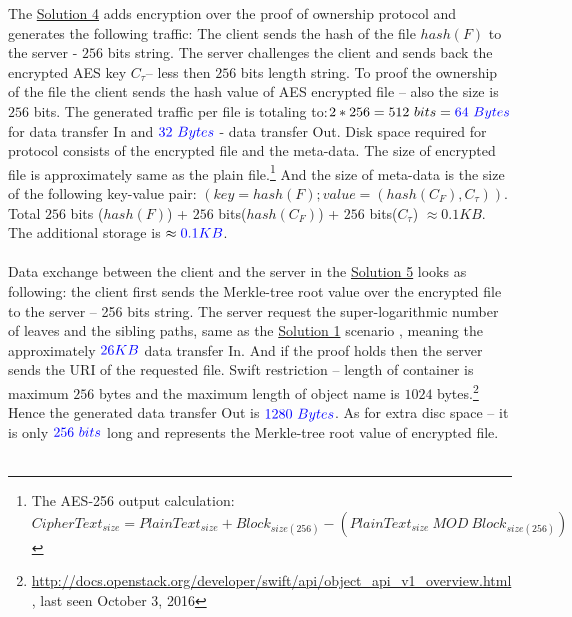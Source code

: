 \documentclass[12pt]{article}
\begin{document}
The \hyperref[sub:Soltuion4]{Solution 4} adds encryption over the proof of ownership protocol and generates the following traffic: The client sends the hash of the file $hash(F)$ to the server - $256$ bits string. The server challenges the client and sends back the encrypted AES key $C_\tau$-- less then $256$  bits length string. To proof the ownership of the file the client  sends the hash value of AES encrypted file -- also the size is $256$  bits. The generated traffic per file is totaling to:$2*256=512\ bits=\color{blue}64\ Bytes$ for data transfer In and $\color{blue}32\ Bytes$ - data transfer Out. Disk space required for protocol consists of the encrypted file and the meta-data. The size of encrypted file is approximately same as the plain file.\footnote{The AES-256 output calculation: $CipherText_{size} = PlainText_{size} + Block_{size(256)} - (PlainText_{size}\ MOD\ Block_{size(256)})$}  And the size of meta-data is the size of the following key-value pair: $(key = hash(F); value = (hash(C_F), C_\tau))$. Total  $256$ bits ($hash(F)$) + $256$ bits($hash(C_F)$) + $256$ bits($C_\tau$) $\approx0.1KB$. The additional storage is $\approx\color{blue}0.1KB$.\\\\
Data exchange between the client and the server in the \hyperref[sub:Soltuion5]{Solution 5} looks as  following: the client first sends the Merkle-tree root value over the encrypted file to the server  -- 256 bits string. The server request the super-logarithmic number of leaves and the sibling paths, same as the \hyperref[sub:Soltuion1]{Solution 1} scenario , meaning the  approximately $\color{blue}26KB$ data transfer In. And if the proof holds then the server sends the URI of the requested file. Swift restriction -- length of container is maximum $256$ bytes and the maximum length of object name is $1024$ bytes.\footnote{\url{http://docs.openstack.org/developer/swift/api/object_api_v1_overview.html}, last seen October 3, 2016} Hence the generated data transfer Out is $\color{blue} 1280\ Bytes$. As for extra disc space -- it is only $\color{blue}256\ bits$  long and represents the Merkle-tree root value of encrypted file.\\\\
\end{document}
